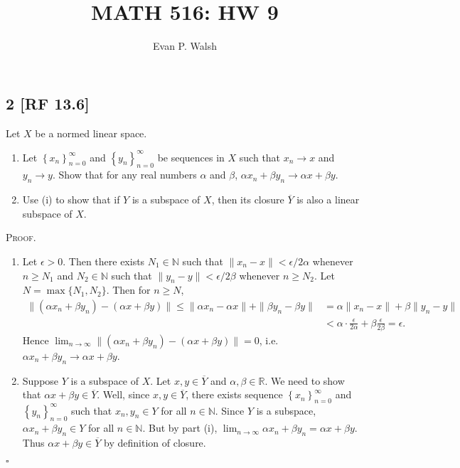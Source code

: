 \documentclass[12pt]{article}
\title{MATH 516: HW 9}
\author{Evan P. Walsh}
\newcounter{ProofCounter}
\newenvironment{Proof}{\stepcounter{ProofCounter}\textsc{Proof.}}{\hfill$\square$}
\begin{document}
\maketitle

\newpage
\subsection*{2 [RF 13.6]}
\begin{tcolorbox}
  Let $X$ be a normed linear space.
  \begin{enumerate}[label = (\roman*)]
    \item Let $\left\{ x_n \right\}_{n=0}^{\infty}$ and $\left\{ y_{n} \right\}_{n=0}^{\infty}$ be sequences in $X$ such that $x_n \rightarrow x$ and
      $y_n \rightarrow y$. Show that for any real numbers $\alpha$ and $\beta$, $\alpha x_n + \beta y_n \rightarrow \alpha x + \beta y$.
    \item Use (i) to show that if $Y$ is a subspace of $X$, then its closure $\overline{Y}$ is also a linear subspace of $X$.
  \end{enumerate}
\end{tcolorbox}
\begin{Proof}
  \begin{enumerate}[label = (\roman*)]
    \item Let $\epsilon > 0$. Then there exists $N_{1} \in \mathbb{N}$ such that $\| x_n - x\| < \epsilon / 2\alpha$ whenever $n \geq N_1$ and $N_2 \in \mathbb{N}$ 
      such that $\|y_n - y\| < \epsilon / 2\beta$ whenever $n \geq N_2$. Let $N = \max\{N_1, N_2\}$. Then for $n \geq N$,
      \begin{align*}
        \|(\alpha x_n + \beta y_n) - (\alpha x + \beta y)\| \leq \|\alpha x_n - \alpha x\| + \|\beta y_n - \beta y\| & = \alpha \|x_n - x\| + \beta
        \|y_n - y\| \\
        & < \alpha \cdot \frac{\epsilon}{2\alpha} + \beta \frac{\epsilon}{2\beta} = \epsilon.
      \end{align*}
      Hence $\lim_{n\rightarrow\infty}\|(\alpha x_n + \beta y_n) - (\alpha x + \beta y)\| = 0$, i.e. $\alpha x_n + \beta y_n \rightarrow \alpha x +
      \beta y$.
    \item Suppose $Y$ is a subspace of $X$. Let $x,y \in \overline{Y}$ and $\alpha, \beta \in \mathbb{R}$. We need to show that $\alpha x + \beta y
      \in \overline{Y}$. Well, since $x,y \in \overline{Y}$, there exists sequence $\left\{ x_n \right\}_{n=0}^{\infty}$ and $\left\{ y_n
      \right\}_{n=0}^{\infty}$ such that $x_n,y_n \in Y$ for all $n \in \mathbb{N}$. Since $Y$ is a subspace, $\alpha x_n + \beta y_n \in Y$ for all $n
      \in \mathbb{N}$. But by part (i), $\lim_{n\rightarrow \infty}\alpha x_n + \beta y_n = \alpha x + \beta y$. Thus $\alpha x + \beta y \in
      \overline{Y}$ by definition of closure.
  \end{enumerate}
\end{Proof}
\end{document}
